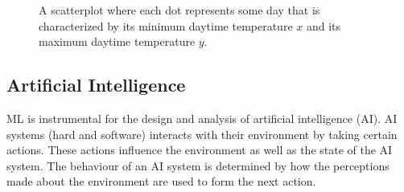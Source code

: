 \documentclass[12pt]{report}
\newcommand{\boundellipse}[3]%
{(#1) ellipse (#2 and #3)
}
\begin{document}
\begin{figure}[htbp]
	\begin{center}
		\vspace*{-14mm}
	\end{center}
	\caption{A scatterplot where each dot represents some day that is characterized 
		by its minimum daytime temperature $x$ and its maximum daytime temperature $y$.}
	\label{fig_scatterplot_temp_FMI_stat_model}
	\vspace*{-3mm}
\end{figure}




\subsection{Artificial Intelligence}

ML is instrumental for the design and analysis of artificial intelligence (AI). 
AI systems (hard and software) interacts with their environment by 
taking certain actions. These actions influence the environment as 
well as the state of the AI system. The behaviour of an AI system 
is determined by how the perceptions made about the environment 
are used to form the next action. 
\end{document}
